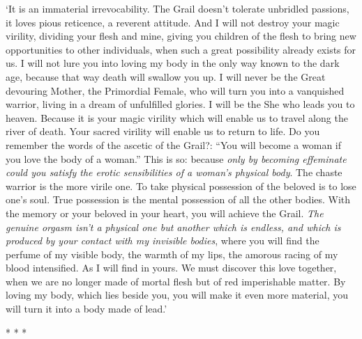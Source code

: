 \begin{quotationx}
`It is an immaterial irrevocability. The Grail doesn't tolerate unbridled passions, it loves pious reticence, a reverent attitude. And I will not destroy your magic virility, dividing your flesh and mine, giving you children of the flesh to bring new opportunities to other individuals, when such a great possibility already exists for us. I will not lure you into loving my body in the only way known to the dark age, because that way death will swallow you up. I will never be the Great devouring Mother, the Primordial Female, who will turn you into a vanquished warrior, living in a dream of unfulfilled glories. I will be the She who leads you to heaven. Because it is your magic virility which will enable us to travel along the river of death. Your sacred virility will enable us to return to life. Do you remember the words of the ascetic of the Grail?: “You will become a woman if you love the body of a woman.” This is so: because \emph{only by becoming effeminate could you satisfy the erotic sensibilities of a woman's physical body}. The chaste warrior is the more virile one. To take physical possession of the beloved is to lose one's soul. True possession is the mental possession of all the other bodies. With the memory or your beloved in your heart, you will achieve the Grail. \emph{The genuine orgasm isn't a physical one but another which is endless, and which is produced by your contact with my invisible bodies}, where you will find the perfume of my visible body, the warmth of my lips, the amorous racing of my blood intensified. As I will find in yours. We must discover this love together, when we are no longer made of mortal flesh but of red imperishable matter. By loving my body, which lies beside you, you will make it even more material, you will turn it into a body made of lead.' 

\end{quotationx}



\begin{center}* * *\end{center}

